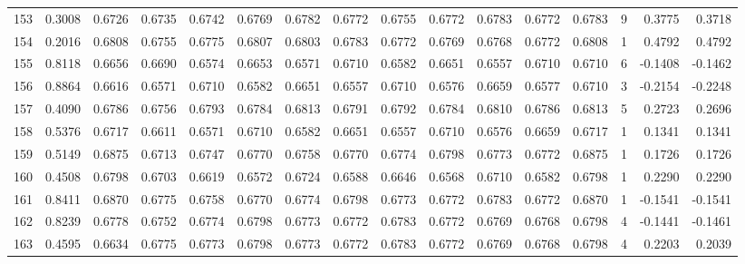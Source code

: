 \begin{tabular}{lrrrrrrrrrrrrrrr}
153 &      0.3008 &  0.6726 &  0.6735 &  0.6742 &  0.6769 &  0.6782 &  0.6772 &  0.6755 &  0.6772 &  0.6783 &   0.6772 &     0.6783 &      9 &                    0.3775 &                     0.3718 \\
154 &      0.2016 &  0.6808 &  0.6755 &  0.6775 &  0.6807 &  0.6803 &  0.6783 &  0.6772 &  0.6769 &  0.6768 &   0.6772 &     0.6808 &      1 &                    0.4792 &                     0.4792 \\
155 &      0.8118 &  0.6656 &  0.6690 &  0.6574 &  0.6653 &  0.6571 &  0.6710 &  0.6582 &  0.6651 &  0.6557 &   0.6710 &     0.6710 &      6 &                   -0.1408 &                    -0.1462 \\
156 &      0.8864 &  0.6616 &  0.6571 &  0.6710 &  0.6582 &  0.6651 &  0.6557 &  0.6710 &  0.6576 &  0.6659 &   0.6577 &     0.6710 &      3 &                   -0.2154 &                    -0.2248 \\
157 &      0.4090 &  0.6786 &  0.6756 &  0.6793 &  0.6784 &  0.6813 &  0.6791 &  0.6792 &  0.6784 &  0.6810 &   0.6786 &     0.6813 &      5 &                    0.2723 &                     0.2696 \\
158 &      0.5376 &  0.6717 &  0.6611 &  0.6571 &  0.6710 &  0.6582 &  0.6651 &  0.6557 &  0.6710 &  0.6576 &   0.6659 &     0.6717 &      1 &                    0.1341 &                     0.1341 \\
159 &      0.5149 &  0.6875 &  0.6713 &  0.6747 &  0.6770 &  0.6758 &  0.6770 &  0.6774 &  0.6798 &  0.6773 &   0.6772 &     0.6875 &      1 &                    0.1726 &                     0.1726 \\
160 &      0.4508 &  0.6798 &  0.6703 &  0.6619 &  0.6572 &  0.6724 &  0.6588 &  0.6646 &  0.6568 &  0.6710 &   0.6582 &     0.6798 &      1 &                    0.2290 &                     0.2290 \\
161 &      0.8411 &  0.6870 &  0.6775 &  0.6758 &  0.6770 &  0.6774 &  0.6798 &  0.6773 &  0.6772 &  0.6783 &   0.6772 &     0.6870 &      1 &                   -0.1541 &                    -0.1541 \\
162 &      0.8239 &  0.6778 &  0.6752 &  0.6774 &  0.6798 &  0.6773 &  0.6772 &  0.6783 &  0.6772 &  0.6769 &   0.6768 &     0.6798 &      4 &                   -0.1441 &                    -0.1461 \\
163 &      0.4595 &  0.6634 &  0.6775 &  0.6773 &  0.6798 &  0.6773 &  0.6772 &  0.6783 &  0.6772 &  0.6769 &   0.6768 &     0.6798 &      4 &                    0.2203 &                     0.2039 \\

\end{tabular}
